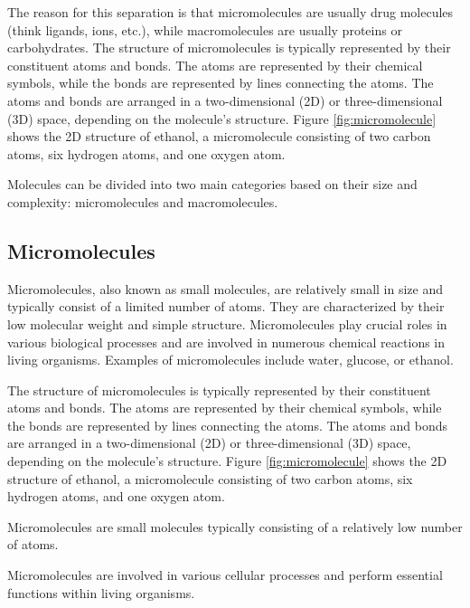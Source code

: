 \documentclass[
  digital,     %
  oneside,     %
  nosansbold,  %
  nocolorbold, %
  lof,         %
  lot,         %
]{fithesis4}
\begin{document}
The reason for this separation is that micromolecules are usually drug molecules (think ligands, ions, etc.), while macromolecules are usually proteins or carbohydrates. The structure of micromolecules is typically represented by their constituent atoms and bonds. The atoms are represented by their chemical symbols, while the bonds are represented by lines connecting the atoms. The atoms and bonds are arranged in a two-dimensional (2D) or three-dimensional (3D) space, depending on the molecule's structure. Figure \ref{fig:micromolecule} shows the 2D structure of ethanol, a micromolecule consisting of two carbon atoms, six hydrogen atoms, and one oxygen atom. 

Molecules can be divided into two main categories based on their size and complexity: micromolecules and macromolecules.

\subsection{Micromolecules}

Micromolecules, also known as small molecules, are relatively small in size and typically consist of a limited number of atoms. They are characterized by their low molecular weight and simple structure. Micromolecules play crucial roles in various biological processes and are involved in numerous chemical reactions in living organisms. Examples of micromolecules include water, glucose, or ethanol.

The structure of micromolecules is typically represented by their constituent atoms and bonds. The atoms are represented by their chemical symbols, while the bonds are represented by lines connecting the atoms. The atoms and bonds are arranged in a two-dimensional (2D) or three-dimensional (3D) space, depending on the molecule's structure. Figure \ref{fig:micromolecule} shows the 2D structure of ethanol, a micromolecule consisting of two carbon atoms, six hydrogen atoms, and one oxygen atom.



Micromolecules are small molecules typically consisting of a relatively low number of atoms.

Micromolecules are involved in various cellular processes and perform essential functions within living organisms.
\end{document}
